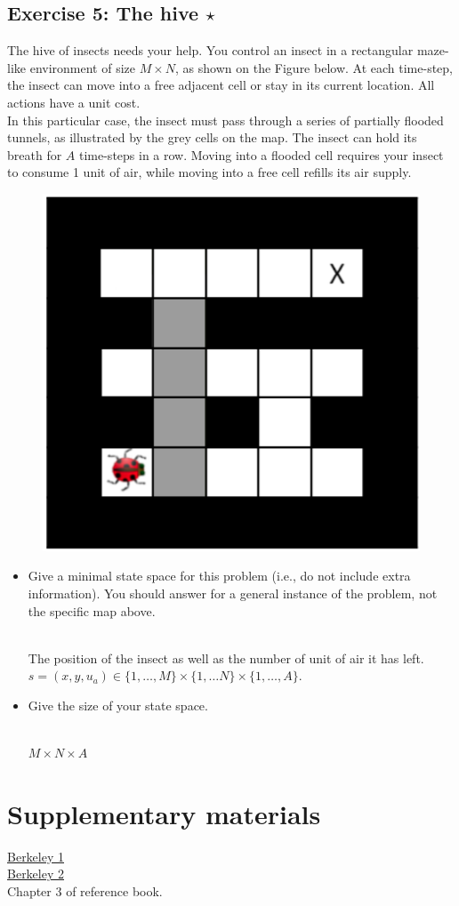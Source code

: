 \documentclass[9pt,a4paper]{extarticle}
\newenvironment{solution}
    {%
    \color{red}
    }
    { 
    \color{black}
    }
\begin{document}
\subsection*{Exercise 5: The hive $\star$}
The hive of insects needs your help. You control an insect in a rectangular maze-like environment
of size $M \times N$, as shown on the Figure below. At each time-step,
the insect can move into a free adjacent cell or stay in its current
location. All actions have a unit cost. \\
In this particular case, the insect must pass through a series of partially
flooded tunnels, as illustrated by the grey cells on the map. The insect can hold its breath for $A$ time-steps in a row. Moving
into a flooded cell requires your insect to consume 1 unit of air, while
moving into a free cell refills its air supply.
\begin{figure}[H]
    \centering
    \includegraphics[width=.2 \textwidth]{figures/hive.png}
    \label{fig:hive}
\end{figure}
\begin{itemize}
    \item Give a minimal state space for this problem (i.e., do not include extra information). You should
answer for a general instance of the problem, not the specific map above.
\begin{solution}
\\
The position of the insect  as well as the number of unit of air it has left. $s = (x, y, u_a) \in \{1, \hdots, M\} \times \{1, \hdots N\} \times \{1, \hdots, A\}$.
\end{solution}
    \item Give the size of your state space.
    \begin{solution}
    \\
    $M\times N \times A$ 
    \end{solution}
\end{itemize}
   \section*{Supplementary materials}
   \href{http://ai.berkeley.edu/sections/section_0_v55LOfoUUwiW1k6Nchnk3Dw6WQuTW8.pdf}{Berkeley 1}\\
   \href{http://ai.berkeley.edu/sections/section_1_0hzy6TFupb1Z3bckfRXdC5KYpsdZOE.pdf}{Berkeley 2}\\
   Chapter 3 of reference book.
\end{document}
